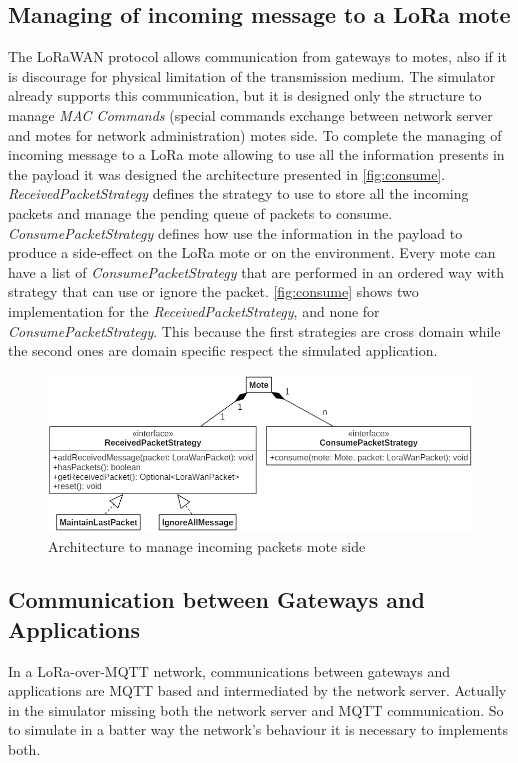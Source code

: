 \subsection{Managing of incoming message to a LoRa mote}
The LoRaWAN protocol allows communication from gateways to motes, also if it is discourage for physical limitation of the transmission medium. 
The simulator already supports this communication, but it is designed only the structure to manage \textit{MAC Commands} (special commands exchange between network server and motes for network administration) motes side.
To complete the managing of incoming message to a LoRa mote allowing to use all the information presents in the payload it was designed the architecture presented in \autoref{fig:consume}.
\mbox{\textit{ReceivedPacketStrategy}} defines the strategy to use to store all the incoming packets and manage the pending queue of packets to consume.
\mbox{\textit{ConsumePacketStrategy}} defines how use the information in the payload to produce a side-effect on the LoRa mote or on the environment. 
Every mote can have a list of \mbox{\textit{ConsumePacketStrategy}} that are performed in an ordered way with strategy that can use or ignore the packet.
\autoref{fig:consume} shows two implementation for the \mbox{\textit{ReceivedPacketStrategy}}, and none for \mbox{\textit{ConsumePacketStrategy}}. This because the first strategies are cross domain while the second ones are domain specific respect the simulated application.
\begin{figure}[h]
    \centering
    \includegraphics[width=\textwidth]{figures/consumePacket.png}
    \caption{Architecture to manage incoming packets mote side}
    \label{fig:consume}
\end{figure}

\subsection{Communication between Gateways and Applications}
In a LoRa-over-MQTT network, communications between gateways and applications are MQTT based and intermediated by the network server.
Actually in the simulator missing both the network server and MQTT communication. 
So to simulate in a batter way the network's behaviour it is necessary to implements both.

